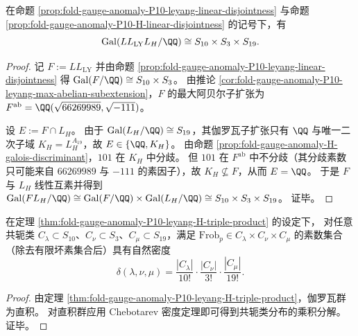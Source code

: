 \begin{theorem}\label{thm:fold-gauge-anomaly-P10-leyang-H-triple-product}
在命题 \ref{prop:fold-gauge-anomaly-P10-leyang-linear-disjointness} 与命题 \ref{prop:fold-gauge-anomaly-P10-H-linear-disjointness} 的记号下，有
\[
\mathrm{Gal}(LL_{\mathrm{LY}}L_H/\QQ)\cong S_{10}\times S_{3}\times S_{19}.
\]
\end{theorem}
\begin{proof}
记 \(F:=LL_{\mathrm{LY}}\) 并由命题 \ref{prop:fold-gauge-anomaly-P10-leyang-linear-disjointness} 得 \(\mathrm{Gal}(F/\QQ)\cong S_{10}\times S_3\)。
由推论 \ref{cor:fold-gauge-anomaly-P10-leyang-max-abelian-subextension}，\(F\) 的最大阿贝尔子扩张为
\(
F^{\mathrm{ab}}=\QQ(\sqrt{66269989},\sqrt{-111})
\)。
\par
设 \(E:=F\cap L_H\)。
由于 \(\mathrm{Gal}(L_H/\QQ)\cong S_{19}\)，其伽罗瓦子扩张只有 \(\QQ\) 与唯一二次子域 \(K_H=L_H^{A_{19}}\)，故 \(E\in\{\QQ,K_H\}\)。
由命题 \ref{prop:fold-gauge-anomaly-H-galois-discriminant}，\(101\) 在 \(K_H\) 中分歧。
但 \(101\) 在 \(F^{\mathrm{ab}}\) 中不分歧（其分歧素数只可能来自 \(66269989\) 与 \(-111\) 的素因子），故 \(K_H\not\subseteq F\)，从而 \(E=\QQ\)。
于是 \(F\) 与 \(L_H\) 线性互素并得到
\(
\mathrm{Gal}(FL_H/\QQ)\cong \mathrm{Gal}(F/\QQ)\times \mathrm{Gal}(L_H/\QQ)
\cong S_{10}\times S_3\times S_{19}
\)。
证毕。
\end{proof}

\begin{corollary}[三重分解型的完全乘法密度]\label{cor:fold-gauge-anomaly-P10-leyang-H-chebotarev-triple-product}
在定理 \ref{thm:fold-gauge-anomaly-P10-leyang-H-triple-product} 的设定下，
对任意共轭类 \(C_\lambda\subset S_{10}\)、\(C_\nu\subset S_3\)、\(C_\mu\subset S_{19}\)，满足 \(\mathrm{Frob}_p\in C_\lambda\times C_\nu\times C_\mu\) 的素数集合（除去有限坏素集合后）具有自然密度
\[
\delta(\lambda,\nu,\mu)=\frac{|C_\lambda|}{10!}\cdot\frac{|C_\nu|}{3!}\cdot\frac{|C_\mu|}{19!}.
\]
\end{corollary}
\begin{proof}
由定理 \ref{thm:fold-gauge-anomaly-P10-leyang-H-triple-product}，伽罗瓦群为直积。
对直积群应用 Chebotarev 密度定理即可得到共轭类分布的乘积分解。证毕。
\end{proof}

